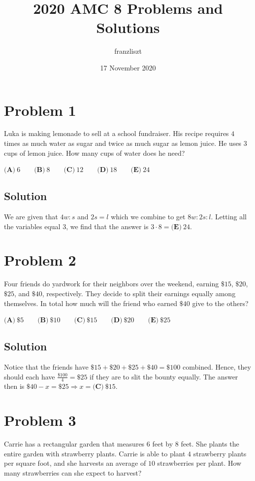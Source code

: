 \documentclass{article}
\title{2020 AMC 8 Problems and Solutions}
\author{franzliszt}
\date{17 November 2020}
\begin{document}
\maketitle

\section{Problem 1}
Luka is making lemonade to sell at a school fundraiser. His recipe requires $4$ times as much water as sugar and twice as much sugar as lemon juice. He uses $3$ cups of lemon juice. How many cups of water does he need?

$\textbf{(A)}\ 6 \qquad \textbf{(B)}\ 8 \qquad \textbf{(C)}\ 12\qquad \textbf{(D)}\ 18 \qquad \textbf{(E)}\ 24$
\subsection{Solution}
We are given that $4w:s$ and $2s=l$ which we combine to get $8w:2s:l$. Letting all the variables equal $3$, we find that the answer is $3\cdot 8=\textbf{(E)}\ 24$.

\section{Problem 2}
Four friends do yardwork for their neighbors over the weekend, earning $\$15$, $\$20$, $\$25$, and $\$40$, respectively. They decide to split their earnings equally among themselves. In total how much will the friend who earned $\$40$ give to the others?

$\textbf{(A)}\ \$5 \qquad \textbf{(B)}\ \$10 \qquad \textbf{(C)}\ \$15\qquad \textbf{(D)}\ \$20 \qquad \textbf{(E)}\ \$25$
\subsection{Solution}
Notice that the friends have $\$15+\$20+\$25+\$40=\$100$ combined. Hence, they should each have $\frac{\$100}{4}=\$25$ if they are to slit the bounty equally. The answer then is $\$40-x=\$25 \Rightarrow x=\textbf{(C)}\ \$15 $. 

\section{Problem 3}
Carrie has a rectangular garden that measures $6$ feet by $8$ feet. She plants the entire garden with strawberry plants. Carrie is able to plant $4$ strawberry plants per square foot, and she harvests an average of $10$ strawberries per plant. How many strawberries can she expect to harvest?
\end{document}
